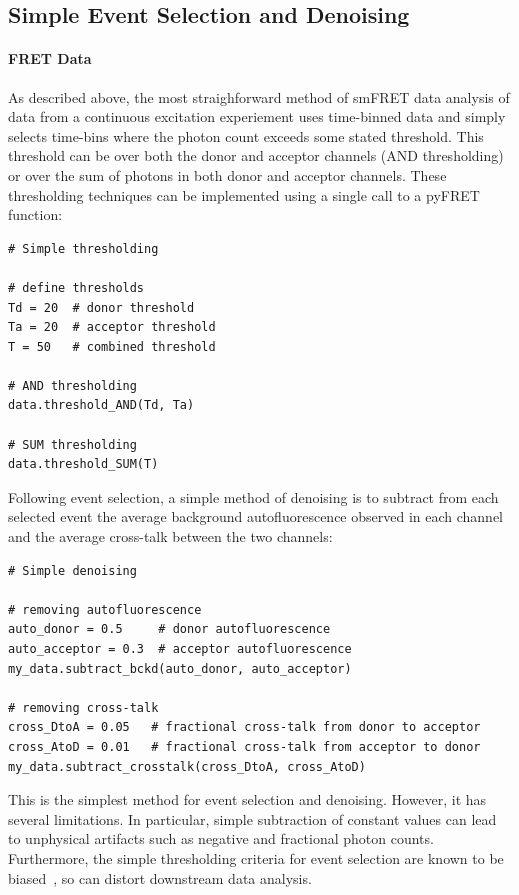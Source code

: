 \subsection{Simple Event Selection and Denoising}
\paragraph{FRET Data}
As described above, the most straighforward method of smFRET data analysis of data from a continuous excitation experiement uses time-binned data and simply selects time-bins where the photon count exceeds some stated threshold. This threshold can be over  both the donor and acceptor channels (AND thresholding) or over the sum of photons in both donor and acceptor channels. These thresholding techniques can be implemented using a single call to a pyFRET function: 

\begin{lstlisting}
# Simple thresholding

# define thresholds
Td = 20  # donor threshold
Ta = 20  # acceptor threshold
T = 50   # combined threshold

# AND thresholding
data.threshold_AND(Td, Ta)

# SUM thresholding
data.threshold_SUM(T)
\end{lstlisting}

Following event selection, a simple method of denoising is to subtract from each selected event the average background autofluorescence observed in each channel and the average cross-talk between the two channels:

\begin{lstlisting}
# Simple denoising

# removing autofluorescence
auto_donor = 0.5     # donor autofluorescence
auto_acceptor = 0.3  # acceptor autofluorescence
my_data.subtract_bckd(auto_donor, auto_acceptor)

# removing cross-talk
cross_DtoA = 0.05   # fractional cross-talk from donor to acceptor
cross_AtoD = 0.01   # fractional cross-talk from acceptor to donor
my_data.subtract_crosstalk(cross_DtoA, cross_AtoD)
\end{lstlisting}

This is the simplest method for event selection and denoising. However, it has several limitations. In particular, simple subtraction of constant values can lead to unphysical artifacts such as negative and fractional photon counts. Furthermore, the simple thresholding criteria for event selection are known to be biased~\cite{nir06}, so can distort downstream data analysis. 

